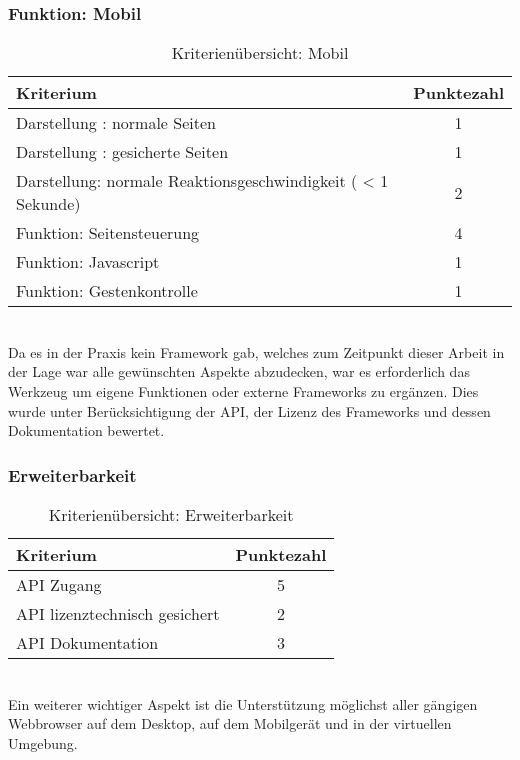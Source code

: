 \subsubsection{Funktion: Mobil}
\begin{table}[H]
 	\vspace{-30pt}
 	\centering
		\begin{tabular}{| p{12cm} | c|}
			\hline
				Kriterium		 &	Punktezahl\\
			\hline
			\hline
				Darstellung : normale Seiten			&1\\
				Darstellung : \gls{gesichert}e Seiten		&	1	\\
				 Darstellung: normale Reaktionsgeschwindigkeit ( < 1 Sekunde)	&	2	\\
				Funktion: Seitensteuerung			&	4	\\
				Funktion: \Gls{Javascript}			&	1	\\
				Funktion: Gestenkontrolle			&	1	\\
				\hline
		\end{tabular}
	\caption{Kriterienübersicht: Mobil}
\end{table}

\\Da es in der Praxis kein \Gls{Framework} gab, welches zum Zeitpunkt dieser Arbeit in der Lage war alle gewünschten Aspekte abzudecken, war es erforderlich das Werkzeug um eigene Funktionen oder externe \Gls{Framework}s zu ergänzen. Dies wurde unter Berücksichtigung der API, der Lizenz des \Gls{Framework}s und dessen Dokumentation bewertet.
\subsubsection{Erweiterbarkeit}
\begin{table}[H]
 	\vspace{-30pt}
 	\centering
		\begin{tabular}{| p{12cm} | c|}
			\hline
				Kriterium		 &	Punktezahl\\
			\hline
			\hline
				API Zugang			&5\\
				API lizenztechnisch gesichert	&	2	\\
				API Dokumentation	&	3	\\
				\hline
		\end{tabular}
	\caption{Kriterienübersicht: Erweiterbarkeit}
\end{table}

\\Ein weiterer wichtiger Aspekt ist die Unterstützung möglichst aller gängigen \Gls{Webbrowser} auf dem Desktop, auf dem Mobilgerät und in der virtuellen Umgebung.

